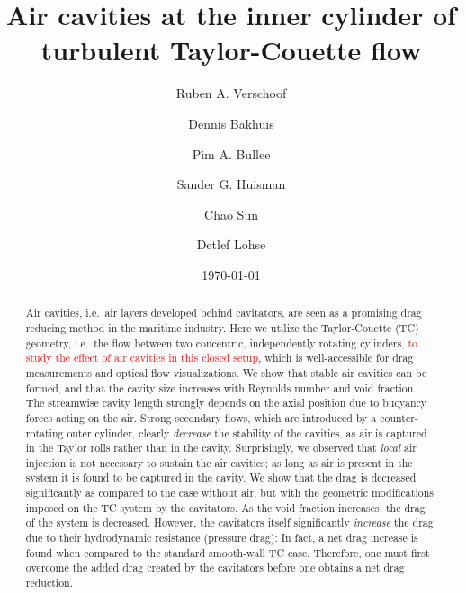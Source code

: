 \documentclass[aps,onecolumn,10pt, floatfix, superscriptaddress,longbibliography, pra]{revtex4-1}
\newcommand{\red}[1]{\textcolor{red}{#1}}
\begin{document}
\title{Air cavities at the inner cylinder of  turbulent Taylor-Couette flow}
\author{Ruben A. Verschoof} 
\author{Dennis Bakhuis} 
\author{Pim A. Bullee} 
\author{Sander G. Huisman} 
\author{Chao Sun}
\author{Detlef Lohse}

\date{\today}

\begin{abstract} 
Air cavities, i.e.\ air layers developed behind cavitators, are seen as a promising drag reducing method in the maritime industry. 
Here we utilize the Taylor-Couette (TC) geometry, i.e.\ the flow between two concentric, independently rotating cylinders, \red{to study the effect of  air cavities in this closed setup}, which is well-accessible for drag measurements and optical flow visualizations. We show that stable air cavities can be formed, and that the cavity size increases with Reynolds number and void fraction. The streamwise cavity length strongly depends on the axial position due to buoyancy forces acting on the air. Strong secondary flows, which are introduced by a counter-rotating outer cylinder, clearly {\it decrease} the stability of the cavities, as air is captured in the Taylor rolls rather than in the cavity. Surprisingly, we observed that {\it local} air injection is not necessary to sustain the air cavities; as long as air is present in the system it is found to be captured in the cavity. We show that the drag is decreased significantly as compared to the case without air, but with the geometric modifications imposed on the TC system by the cavitators. As the void fraction increases, the drag of the system is decreased. However, the cavitators itself significantly {\it increase} the drag due to their hydrodynamic resistance (pressure drag): In fact, a net drag increase is found when  compared to the standard   smooth-wall TC case.  Therefore, one must first overcome the added drag created by the cavitators before one obtains a net drag reduction.
\end{abstract}
\end{document}
